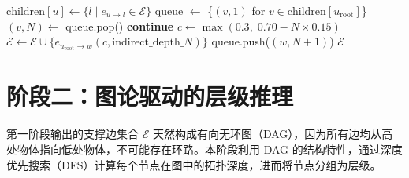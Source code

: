 \documentclass[12pt,a4paper]{article}
\begin{document}
\begin{algorithm}[htbp]
\begin{algorithmic}[1]
    \State $\text{children}[u] \gets \{l \mid e_{u \to l} \in \mathcal{E}\}$ 
        \State queue $\gets$ \{$(v, 1)$ for $v \in \text{children}[u_{\text{root}}]$\}
            \State $(v, N) \gets$ queue.pop()
             \textbf{continue} \EndIf
                    \State $c \gets \max(0.3,\; 0.70 - N \times 0.15)$
                    \State $\mathcal{E} \gets \mathcal{E} \cup \{e_{u_{\text{root}} \to w}(c, \text{indirect\_depth\_}N)\}$
                    \State queue.push($(w, N+1)$)
                \EndIf
            \EndFor
        \EndWhile
    \EndFor
\EndIf
\State \Return $\mathcal{E}$
\end{algorithmic}
\end{algorithm}

\section{阶段二：图论驱动的层级推理}

第一阶段输出的支撑边集合 $\mathcal{E}$ 天然构成有向无环图（DAG），因为所有边均从高处物体指向低处物体，不可能存在环路。本阶段利用 DAG 的结构特性，通过深度优先搜索（DFS）计算每个节点在图中的拓扑深度，进而将节点分组为层级。
\end{document}
